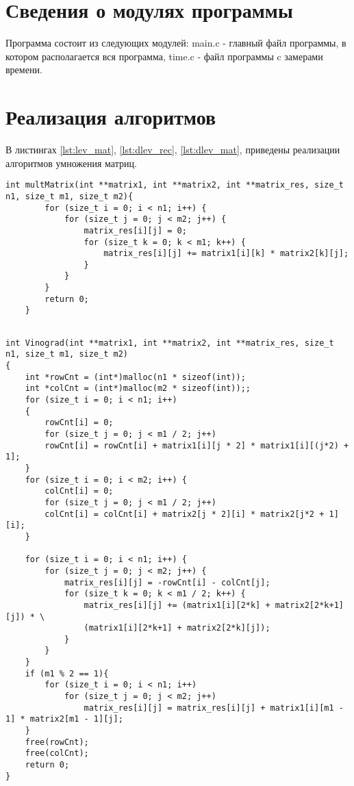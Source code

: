 \section{Сведения о модулях программы}
Программа состоит из следующих модулей:
main.c - главный файл программы, в котором располагается вся программа,
time.c - файл программы c замерами времени.


\section{Реализация алгоритмов}

В листингах \ref{lst:lev_mat}, \ref{lst:dlev_rec}, \ref{lst:dlev_mat},  приведены реализации алгоритмов умножения матриц.
\newpage
\begin{lstlisting}[label=lst:lev_mat,caption=Стандартный алгоритм умножения матриц.]
	int multMatrix(int **matrix1, int **matrix2, int **matrix_res, size_t n1, size_t m1, size_t m2){
		for (size_t i = 0; i < n1; i++) {
			for (size_t j = 0; j < m2; j++) {
				matrix_res[i][j] = 0;
				for (size_t k = 0; k < m1; k++) {
					matrix_res[i][j] += matrix1[i][k] * matrix2[k][j];
				}
			}
		}
		return 0;
	}
	
\end{lstlisting}
\newpage
\begin{lstlisting}[label=lst:dlev_rec,caption=Алгоритм Винограда]
int Vinograd(int **matrix1, int **matrix2, int **matrix_res, size_t n1, size_t m1, size_t m2)
{
    int *rowCnt = (int*)malloc(n1 * sizeof(int));
	int *colCnt = (int*)malloc(m2 * sizeof(int));;
	for (size_t i = 0; i < n1; i++)
	{
		rowCnt[i] = 0;
		for (size_t j = 0; j < m1 / 2; j++)
		rowCnt[i] = rowCnt[i] + matrix1[i][j * 2] * matrix1[i][(j*2) + 1];
	}
	for (size_t i = 0; i < m2; i++) {
		colCnt[i] = 0;
		for (size_t j = 0; j < m1 / 2; j++)
		colCnt[i] = colCnt[i] + matrix2[j * 2][i] * matrix2[j*2 + 1][i];
	}
	
	for (size_t i = 0; i < n1; i++) {
		for (size_t j = 0; j < m2; j++) {
			matrix_res[i][j] = -rowCnt[i] - colCnt[j];
			for (size_t k = 0; k < m1 / 2; k++) {
				matrix_res[i][j] += (matrix1[i][2*k] + matrix2[2*k+1][j]) * \
				(matrix1[i][2*k+1] + matrix2[2*k][j]);
			}
		}
	}
	if (m1 % 2 == 1){
		for (size_t i = 0; i < n1; i++)
			for (size_t j = 0; j < m2; j++)
				matrix_res[i][j] = matrix_res[i][j] + matrix1[i][m1 - 1] * matrix2[m1 - 1][j];
	}
	free(rowCnt);
	free(colCnt);
	return 0;
}
	
\end{lstlisting}
\newpage
